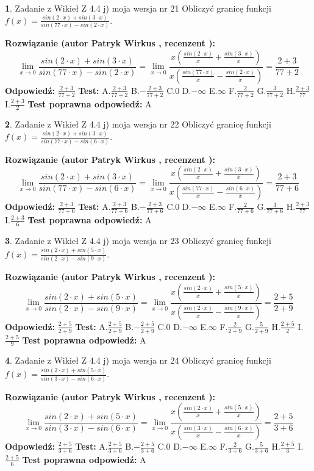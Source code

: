 \documentclass[12pt, a4paper]{article}
\theoremstyle{definition} %
\newtheorem{zad}{}
\newcommand{\zadStart}[1]{\begin{zad}#1\newline}
\newcommand{\zadStop}{\end{zad}}
\newcommand{\rozwStart}[2]{\noindent \textbf{Rozwiązanie (autor #1 , recenzent #2): }\newline}
\newcommand{\rozwStop}{\newline}
\newcommand{\odpStart}{\noindent \textbf{Odpowiedź:}\newline}
\newcommand{\odpStop}{\newline}
\newcommand{\testStart}{\noindent \textbf{Test:}\newline}
\newcommand{\testStop}{\newline}
\newcommand{\kluczStart}{\noindent \textbf{Test poprawna odpowiedź:}\newline}
\newcommand{\kluczStop}{\newline}
\begin{document}
\zadStart{Zadanie z Wikieł Z 4.4 j) moja wersja nr 21}
Obliczyć granicę funkcji $f(x)=\frac{sin(2\cdot x) +sin(3\cdot x)}{sin(77\cdot x) -sin(2\cdot x)}$.
\zadStop
\rozwStart{Patryk Wirkus}{}
$$\lim\limits_{x\to 0}\frac{sin(2\cdot x) +sin(3\cdot x)}{sin(77\cdot x) -sin(2\cdot x)}=\lim\limits_{x\to 0}\frac{x(\frac{sin(2\cdot x)}{x}+\frac{sin(3\cdot x)}{x})}{x(\frac{sin(77\cdot x)}{x}-\frac{sin(2\cdot x)}{x})}=\frac{2+3}{77+2}$$
\rozwStop
\odpStart
$\frac{2+3}{77+2}$
\odpStop
\testStart
A.$\frac{2+3}{77+2}$
B.$-\frac{2+3}{77+2}$
C.$0$
D.$-\infty$
E.$\infty$
F.$\frac{2}{77+2}$
G.$\frac{3}{77+2}$
H.$\frac{2+3}{77}$
I.$\frac{2+3}{2}$
\testStop
\kluczStart
A
\kluczStop



\zadStart{Zadanie z Wikieł Z 4.4 j) moja wersja nr 22}
Obliczyć granicę funkcji $f(x)=\frac{sin(2\cdot x) +sin(3\cdot x)}{sin(77\cdot x) -sin(6\cdot x)}$.
\zadStop
\rozwStart{Patryk Wirkus}{}
$$\lim\limits_{x\to 0}\frac{sin(2\cdot x) +sin(3\cdot x)}{sin(77\cdot x) -sin(6\cdot x)}=\lim\limits_{x\to 0}\frac{x(\frac{sin(2\cdot x)}{x}+\frac{sin(3\cdot x)}{x})}{x(\frac{sin(77\cdot x)}{x}-\frac{sin(6\cdot x)}{x})}=\frac{2+3}{77+6}$$
\rozwStop
\odpStart
$\frac{2+3}{77+6}$
\odpStop
\testStart
A.$\frac{2+3}{77+6}$
B.$-\frac{2+3}{77+6}$
C.$0$
D.$-\infty$
E.$\infty$
F.$\frac{2}{77+6}$
G.$\frac{3}{77+6}$
H.$\frac{2+3}{77}$
I.$\frac{2+3}{6}$
\testStop
\kluczStart
A
\kluczStop



\zadStart{Zadanie z Wikieł Z 4.4 j) moja wersja nr 23}
Obliczyć granicę funkcji $f(x)=\frac{sin(2\cdot x) +sin(5\cdot x)}{sin(2\cdot x) -sin(9\cdot x)}$.
\zadStop
\rozwStart{Patryk Wirkus}{}
$$\lim\limits_{x\to 0}\frac{sin(2\cdot x) +sin(5\cdot x)}{sin(2\cdot x) -sin(9\cdot x)}=\lim\limits_{x\to 0}\frac{x(\frac{sin(2\cdot x)}{x}+\frac{sin(5\cdot x)}{x})}{x(\frac{sin(2\cdot x)}{x}-\frac{sin(9\cdot x)}{x})}=\frac{2+5}{2+9}$$
\rozwStop
\odpStart
$\frac{2+5}{2+9}$
\odpStop
\testStart
A.$\frac{2+5}{2+9}$
B.$-\frac{2+5}{2+9}$
C.$0$
D.$-\infty$
E.$\infty$
F.$\frac{2}{2+9}$
G.$\frac{5}{2+9}$
H.$\frac{2+5}{2}$
I.$\frac{2+5}{9}$
\testStop
\kluczStart
A
\kluczStop



\zadStart{Zadanie z Wikieł Z 4.4 j) moja wersja nr 24}
Obliczyć granicę funkcji $f(x)=\frac{sin(2\cdot x) +sin(5\cdot x)}{sin(3\cdot x) -sin(6\cdot x)}$.
\zadStop
\rozwStart{Patryk Wirkus}{}
$$\lim\limits_{x\to 0}\frac{sin(2\cdot x) +sin(5\cdot x)}{sin(3\cdot x) -sin(6\cdot x)}=\lim\limits_{x\to 0}\frac{x(\frac{sin(2\cdot x)}{x}+\frac{sin(5\cdot x)}{x})}{x(\frac{sin(3\cdot x)}{x}-\frac{sin(6\cdot x)}{x})}=\frac{2+5}{3+6}$$
\rozwStop
\odpStart
$\frac{2+5}{3+6}$
\odpStop
\testStart
A.$\frac{2+5}{3+6}$
B.$-\frac{2+5}{3+6}$
C.$0$
D.$-\infty$
E.$\infty$
F.$\frac{2}{3+6}$
G.$\frac{5}{3+6}$
H.$\frac{2+5}{3}$
I.$\frac{2+5}{6}$
\testStop
\kluczStart
A
\kluczStop
\end{document}
